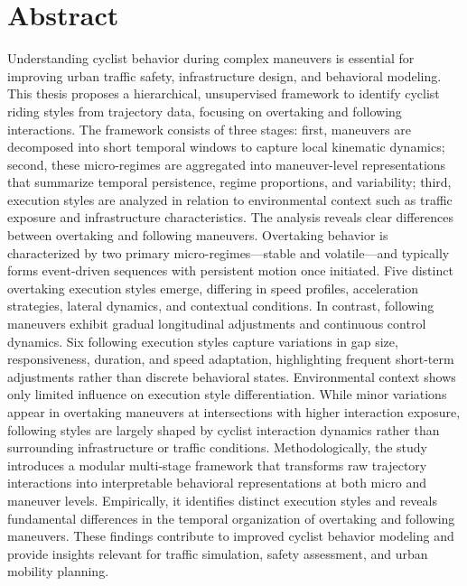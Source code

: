 \chapter*{Abstract}

Understanding cyclist behavior during complex maneuvers is essential for improving urban traffic safety, infrastructure design, and behavioral modeling. This thesis proposes a hierarchical, unsupervised framework to identify cyclist riding styles from trajectory data, focusing on overtaking and following interactions. The framework consists of three stages: first, maneuvers are decomposed into short temporal windows to capture local kinematic dynamics; second, these micro-regimes are aggregated into maneuver-level representations that summarize temporal persistence, regime proportions, and variability; third, execution styles are analyzed in relation to environmental context such as traffic exposure and infrastructure characteristics.
The analysis reveals clear differences between overtaking and following maneuvers. Overtaking behavior is characterized by two primary micro-regimes—stable and volatile—and typically forms event-driven sequences with persistent motion once initiated. Five distinct overtaking execution styles emerge, differing in speed profiles, acceleration strategies, lateral dynamics, and contextual conditions. In contrast, following maneuvers exhibit gradual longitudinal adjustments and continuous control dynamics. Six following execution styles capture variations in gap size, responsiveness, duration, and speed adaptation, highlighting frequent short-term adjustments rather than discrete behavioral states.
Environmental context shows only limited influence on execution style differentiation. While minor variations appear in overtaking maneuvers at intersections with higher interaction exposure, following styles are largely shaped by cyclist interaction dynamics rather than surrounding infrastructure or traffic conditions.
Methodologically, the study introduces a modular multi-stage framework that transforms raw trajectory interactions into interpretable behavioral representations at both micro and maneuver levels. Empirically, it identifies distinct execution styles and reveals fundamental differences in the temporal organization of overtaking and following maneuvers. These findings contribute to improved cyclist behavior modeling and provide insights relevant for traffic simulation, safety assessment, and urban mobility planning.


\tableofcontents
